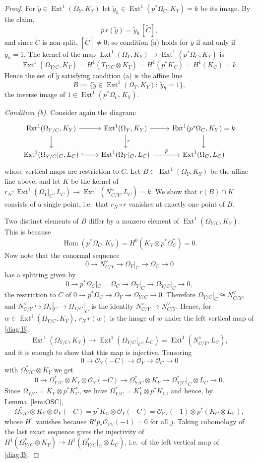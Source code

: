\documentclass[11pt,twoside]{amsart}
\theoremstyle{plain}
\theoremstyle{definition}
\newcommand{\PP}{\mathbb{P}}
\newcommand{\OO}{\mathcal{O}}
\newcommand{\Hom}{\operatorname{Hom}}
\newcommand{\Ext}{\operatorname{Ext}}
\newcommand{\Ct}{\widetilde{C}}
\newcommand{\yt}{\tilde{y}}
\begin{document}
\begin{proof}
For $\yt\in\Ext^1(\Omega_Y,K_Y)$ let $\yt_h\in\Ext^1(p^*\Omega_C,K_Y)=k$ be its image. By the claim,
\begin{equation}\label{eq:pbar-r}
\bar p\,r(\yt)=\yt_h\,[\Ct] ,
\end{equation}
and since $\Ct$ is non-split, $[\Ct]\ne0$; so condition (a) holds for $\yt$ if and only if $\yt_h=1$. The kernel of the map $\Ext^1(\Omega_Y,K_Y)\to\Ext^1(p^*\Omega_C,K_Y)$ is
\[
\Ext^1(\Omega_{Y/C},K_Y)=H^1(T_{Y/C}\otimes K_Y)=H^1(p^*K_C)=H^1(K_C)=k .
\]
Hence the set of $\yt$ satisfying condition (a) is the affine line
\[
B:=\{\yt\in\Ext^1(\Omega_Y,K_Y):\ \yt_h=1\},
\]
the inverse image of $1\in\Ext^1(p^*\Omega_C,K_Y)$.

\emph{Condition (b).} Consider again the diagram:
\begin{equation}
\begin{tikzcd}
\Ext^1(\Omega_{Y/C},K_Y)\arrow[r]\arrow[d] & \Ext^1(\Omega_Y,K_Y)\arrow[r]\arrow[d,"r"] & \Ext^1(p^*\Omega_C,K_Y)=k\arrow[d]\\
\Ext^1(\Omega_{Y/C}|_C,L_C)\arrow[r,hook] & \Ext^1(\Omega_Y|_C,L_C)\arrow[r,"\bar p"] & \Ext^1(\Omega_C,L_C)
\end{tikzcd}
\end{equation}
whose vertical maps are restriction to $C$. Let $B\subset\Ext^1(\Omega_Y,K_Y)$ be the affine line above, and let $K$ be the kernel of $r_N\colon\Ext^1(\Omega_Y|_C,L_C)\to\Ext^1(N_{C/Y}^{\vee},L_C)=k$. We show that $r(B)\cap K$ consists of a single point, i.e.\ that $r_N\circ r$ vanishes at exactly one point of $B$.

Two distinct elements of $B$ differ by a nonzero element of $\Ext^1(\Omega_{Y/C},K_Y)$. This is because
\[
\Hom(p^*\Omega_C,K_Y)=H^0(K_Y\otimes p^*\Omega_C^{*})=0 .
\]
Now note that the conormal sequence
\[
0\to N_{C/Y}^{\vee}\to\Omega_Y|_C\to\Omega_C\to0
\]
has a splitting given by
\[
0\to p^*\Omega_C|_C=\Omega_C\to\Omega_Y|_C\to\Omega_{Y/C}|_C\to0 ,
\]
the restriction to $C$ of $0\to p^*\Omega_C\to\Omega_Y\to\Omega_{Y/C}\to0$. Therefore $\Omega_{Y/C}|_C\cong N_{C/Y}^{\vee}$, and $N_{C/Y}^{\vee}\hookrightarrow\Omega_Y|_C\to\Omega_{Y/C}|_C$ is the identity $N_{C/Y}^{\vee}\to N_{C/Y}^{\vee}$. Hence, for $w\in\Ext^1(\Omega_{Y/C},K_Y)$, $r_N\,r(w)$ is the image of $w$ under the left vertical map of \eqref{diag:B},
\[
\Ext^1(\Omega_{Y/C},K_Y)\to\Ext^1(\Omega_{Y/C}|_C,L_C)=\Ext^1(N_{C/Y}^{\vee},L_C),
\]
and it is enough to show that this map is injective. Tensoring
\[
0\to\OO_Y(-C)\to\OO_Y\to\OO_C\to0
\]
with $\Omega_{Y/C}^{*}\otimes K_Y$ we get
\[
0\to\Omega_{Y/C}^{*}\otimes K_Y\otimes\OO_Y(-C)\to\Omega_{Y/C}^{*}\otimes K_Y\to\Omega_{Y/C}^{*}|_C\otimes L_C\to0 .
\]
Since $\Omega_{Y/C}=K_Y\otimes p^*K_C^{*}$, we have $\Omega_{Y/C}^{*}=K_Y^{*}\otimes p^*K_C$, and hence, by Lemma~\ref{lem:OSC},
\[
\Omega_{Y/C}^{*}\otimes K_Y\otimes\OO_Y(-C)=p^*K_C\otimes\OO_Y(-C)=\OO_{\PP V}(-1)\otimes p^*(K_C\otimes L_C),
\]
whose $H^1$ vanishes because $R^jp_*\OO_{\PP V}(-1)=0$ for all $j$. Taking cohomology of the last exact sequence gives the injectivity of $H^1(\Omega_{Y/C}^{*}\otimes K_Y)\to H^1(\Omega_{Y/C}^{*}|_C\otimes L_C)$, i.e.\ of the left vertical map of \eqref{diag:B}.


\end{proof}
\end{document}
